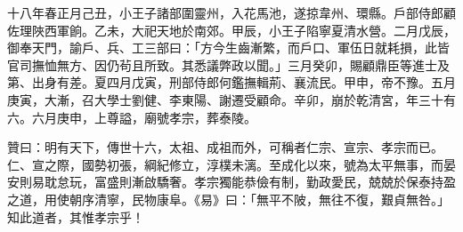 \begin{pinyinscope}
十八年春正月己丑，小王子諸部圍靈州，入花馬池，遂掠韋州、環縣。戶部侍郎顧佐理陜西軍餉。乙未，大祀天地於南郊。甲辰，小王子陷寧夏清水營。二月戊辰，御奉天門，諭戶、兵、工三部曰：「方今生齒漸繁，而戶口、軍伍日就耗損，此皆官司撫恤無方、因仍茍且所致。其悉議弊政以聞。」三月癸卯，賜顧鼎臣等進士及第、出身有差。夏四月戊寅，刑部侍郎何鑑撫輯荊、襄流民。甲申，帝不豫。五月庚寅，大漸，召大學士劉健、李東陽、謝遷受顧命。辛卯，崩於乾清宮，年三十有六。六月庚申，上尊謚，廟號孝宗，葬泰陵。

贊曰：明有天下，傳世十六，太祖、成祖而外，可稱者仁宗、宣宗、孝宗而已。仁、宣之際，國勢初張，綱紀修立，淳樸未漓。至成化以來，號為太平無事，而晏安則易耽怠玩，富盛則漸啟驕奢。孝宗獨能恭儉有制，勤政愛民，兢兢於保泰持盈之道，用使朝序清寧，民物康阜。《易》曰：「無平不陂，無往不復，艱貞無咎。」知此道者，其惟孝宗乎！


\end{pinyinscope}